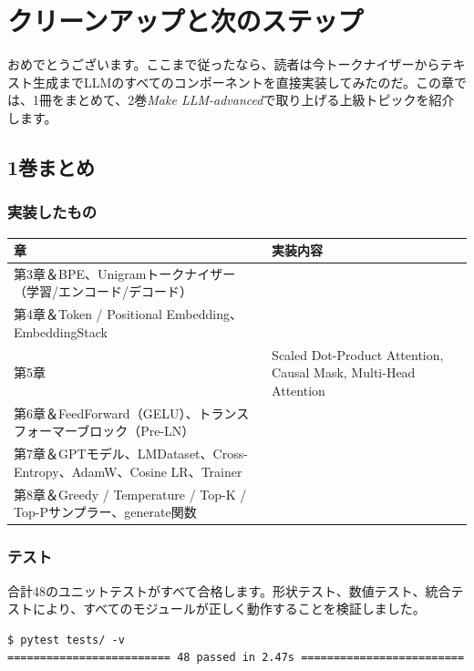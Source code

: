 \chapter{クリーンアップと次のステップ}
\label{ch:wrapup}

おめでとうございます。ここまで従ったなら、読者は今トークナイザーからテキスト生成までLLMのすべてのコンポーネントを直接実装してみたのだ。この章では、1冊をまとめて、2巻\textit{Make LLM-advanced}で取り上げる上級トピックを紹介します。

\section{1巻まとめ}

\subsection{実装したもの}

\begin{center}
\begin{tabularx}{\textwidth}{lX}
\toprule
\textbf{章}&\textbf{実装内容}\\
\midrule
第3章＆BPE、Unigramトークナイザー（学習/エンコード/デコード）\\
第4章＆Token / Positional Embedding、EmbeddingStack \\
第5章 & Scaled Dot-Product Attention, Causal Mask, Multi-Head Attention \\
第6章＆FeedForward（GELU）、トランスフォーマーブロック（Pre-LN）\\
第7章＆GPTモデル、LMDataset、Cross-Entropy、AdamW、Cosine LR、Trainer \\
第8章＆Greedy / Temperature / Top-K / Top-Pサンプラー、generate関数\\
\bottomrule
\end{tabularx}
\end{center}

\subsection{テスト}

合計48のユニットテストがすべて合格します。形状テスト、数値テスト、統合テストにより、すべてのモジュールが正しく動作することを検証しました。

\begin{lstlisting}[style=bashstyle]
$ pytest tests/ -v
========================= 48 passed in 2.47s =========================
\end{lstlisting}

